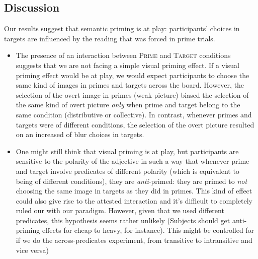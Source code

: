 \documentclass[a4paper]{article}
\newcommand{\addMM}[1]{{\leavevmode\color{red}#1}}
\begin{document}
\subsection{Discussion}
Our results suggest that semantic priming is at play: participants' choices in targets are influenced by the reading that was forced in prime trials. 

\begin{itemize}

\item The presence of an interaction between \textsc{Prime} and \textsc{Target} conditions suggests that we are not facing a simple visual priming effect. If a visual priming effect would be at play, we would expect participants to choose the same kind of images in primes and targets across the board. 
However, the selection of the overt image in primes (weak picture) biased the selection of the same kind of overt picture \emph{only} when prime and target belong to the same condition (distributive or collective). In contrast, whenever primes and targets were of different conditions, the selection of the overt picture resulted on an increased of blur choices in targets. 

\item One might still think that visual priming is at play, but participants are sensitive to the polarity of the adjective in such a way that whenever prime and target involve predicates of different polarity (which is equivalent to being of different conditions), they are \emph{anti}-primed: they are primed to \emph{not} choosing the same image in targets as they did in primes. This kind of effect could also give rise to the attested interaction and it's difficult to completely ruled our with our paradigm. 
However, given that we used different predicates, this hypothesis seems rather unlikely (\addMM{Subjects should get anti-priming effects for cheap to heavy, for instance}). 
\addMM{This might be controlled for if we do the across-predicates experiment, from transitive to intransitive and vice versa)}

\end{itemize}
\end{document}
